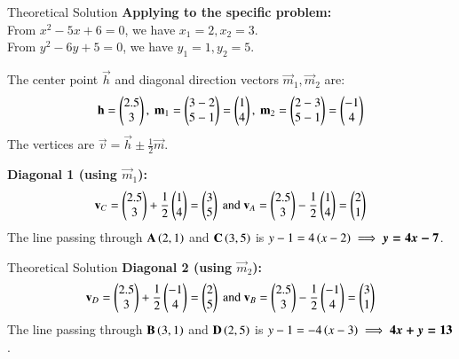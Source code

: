 \documentclass{beamer}
\begin{document}
\begin{frame}{Theoretical Solution}
\textbf{Applying to the specific problem:} \\
From $x^2 - 5x + 6 = 0$, we have $x_1=2, x_2=3$. \\
From $y^2 - 6y + 5 = 0$, we have $y_1=1, y_2=5$.

\noindent
The center point $\vec{h}$ and diagonal direction vectors $\vec{m}_1, \vec{m}_2$ are:
\vspace{0.2cm}
\begin{align}
    \vec{h} = \myvec{ 2.5 \\ 3 }, \ 
    \vec{m}_1 = \myvec{ 3-2 \\ 5-1 } = \myvec{ 1 \\ 4 }, \ 
    \vec{m}_2 = \myvec{ 2-3 \\ 5-1 } = \myvec{ -1 \\ 4 }
\end{align}
The vertices are $\vec{v} = \vec{h} \pm \frac{1}{2}\vec{m}$.

\noindent
\textbf{Diagonal 1 (using $\vec{m}_1$):}
\vspace{0.2cm}
\begin{align*}
    \vec{v}_C = \myvec{ 2.5 \\ 3 } + \frac{1}{2}\myvec{ 1 \\ 4 } = \myvec{ 3 \\ 5 } \  \text{and} \ 
    \vec{v}_A = \myvec{ 2.5 \\ 3 } - \frac{1}{2}\myvec{ 1 \\ 4 } = \myvec{ 2 \\ 1 }
\end{align*}
The line passing through $\mathbf{A}\left(2,1\right)$ and $\mathbf{C}\left(3,5\right)$ is $y-1 = 4\left(x-2\right) \implies \boldsymbol{y = 4x - 7}$.
\end{frame}
\begin{frame}{Theoretical Solution}
    \textbf{Diagonal 2 (using $\vec{m}_2$):}
\begin{align*}
    \vec{v}_D = \myvec{ 2.5 \\ 3} + \frac{1}{2}\myvec{ -1 \\ 4 } = \myvec{ 2 \\ 5 } \  \text{and} \ 
    \vec{v}_B = \myvec{ 2.5 \\ 3 } - \frac{1}{2}\myvec{-1 \\ 4 } = \myvec{ 3 \\ 1 }
\end{align*}
The line passing through $\mathbf{B}\left(3,1\right)$ and $\mathbf{D}\left(2,5\right)$ is $y-1 = -4\left(x-3\right) \implies \boldsymbol{4x + y = 13}$.
\end{frame}
\end{document}
